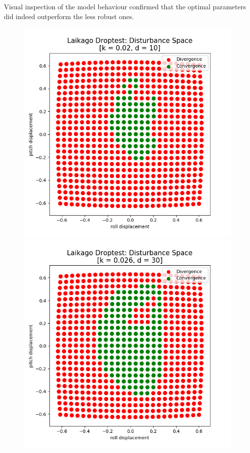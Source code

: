     Visual inspection of the model behaviour confirmed that the optimal parameters did indeed outperform the less robust ones. 



    \begin{figure}[h]
        \centering
        \begin{minipage}{0.33\textwidth}
            \centering
            \includegraphics[width=\textwidth]{figures/droptest_ds_bad_correct.png} %
        \end{minipage}\hfill
        \begin{minipage}{0.33\textwidth}
            \centering
            \includegraphics[width=\textwidth]{figures/droptest_ds_medium_correct.png} %

\end{minipage}
\end{figure}
